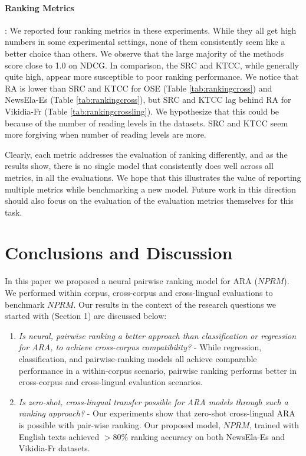 \documentclass[11pt]{article}
\begin{document}
\paragraph{Ranking Metrics}: We reported four ranking metrics in these experiments. While they all get high numbers in some experimental settings, none of them consistently seem like a better choice than others. We observe that the large majority of the methods score close to 1.0 on NDCG. In comparison, the SRC and KTCC, while generally quite high, appear more susceptible to poor ranking performance. We notice that RA is lower than SRC and KTCC for OSE (Table \ref{tab:rankingcross}) and NewsEla-Es (Table \ref{tab:rankingcross}), but SRC and KTCC lag behind RA for Vikidia-Fr (Table \ref{tab:rankingcrossling}). We hypothesize that this could be because of the number of reading levels in the datasets. SRC and KTCC seem more forgiving when number of reading levels are more. 

Clearly, each metric addresses the evaluation of ranking differently, and as the results show, there is no single model that consistently does well across all metrics, in all the evaluations. We hope that this illustrates the value of reporting multiple metrics while benchmarking a new model. Future work in this direction should also focus on the evaluation of the evaluation metrics themselves for this task.

\section{Conclusions and Discussion}
\label{sec:disc}
In this paper we proposed a neural pairwise ranking model for ARA ($NPRM$). We performed within corpus, cross-corpus and cross-lingual evaluations to benchmark $NPRM$. Our results in the context of the research questions we started with (Section 1) are discussed below:
\begin{enumerate}
 \item \textit{Is neural, pairwise ranking a better approach than classification or regression for ARA, to achieve cross-corpus compatibility?} - While regression, classification, and pairwise-ranking models all achieve comparable performance in a within-corpus scenario, pairwise ranking performs better in cross-corpus and cross-lingual evaluation scenarios.  
 
    \item \textit{Is zero-shot, cross-lingual transfer possible for ARA models through such a ranking approach?} - Our experiments show that zero-shot cross-lingual ARA is possible with pair-wise ranking. Our proposed model, $NPRM$, trained with English texts achieved $>80$\% ranking accuracy on both NewsEla-Es and Vikidia-Fr datasets. 
\end{enumerate}
\end{document}
